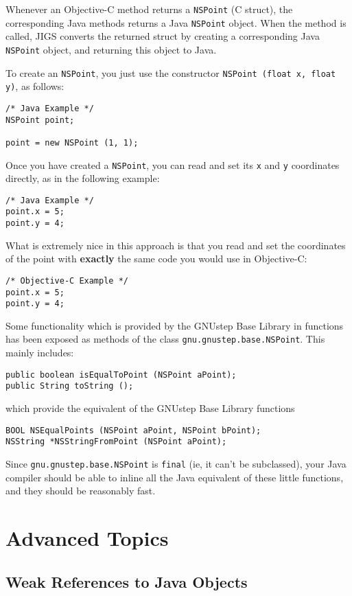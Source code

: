 Whenever an Objective-C method returns a \texttt{NSPoint} (C struct),
the corresponding Java methods returns a Java \texttt{NSPoint} object.
When the method is called, JIGS converts the returned struct by
creating a corresponding Java \texttt{NSPoint} object, and returning
this object to Java.

To create an \texttt{NSPoint}, you just use the constructor
\texttt{NSPoint (float x, float y)}, as follows:
\begin{verbatim}
/* Java Example */
NSPoint point;

point = new NSPoint (1, 1);
\end{verbatim}
Once you have created a \texttt{NSPoint}, you can read and set its
\texttt{x} and \texttt{y} coordinates directly, as in the following
example:
\begin{verbatim}
/* Java Example */
point.x = 5;
point.y = 4;
\end{verbatim}
What is extremely nice in this approach is that you read and set the
coordinates of the point with {\bf exactly} the same code you would
use in Objective-C:
\begin{verbatim}
/* Objective-C Example */
point.x = 5;
point.y = 4;
\end{verbatim}

Some functionality which is provided by the GNUstep Base Library in
functions has been exposed as methods of the class
\texttt{gnu.gnustep.base.NSPoint}.  This mainly includes:
\begin{verbatim}
public boolean isEqualToPoint (NSPoint aPoint);
public String toString ();
\end{verbatim}
which provide the equivalent of the GNUstep Base Library functions
\begin{verbatim}
BOOL NSEqualPoints (NSPoint aPoint, NSPoint bPoint);
NSString *NSStringFromPoint (NSPoint aPoint);
\end{verbatim}
Since \texttt{gnu.gnustep.base.NSPoint} is \texttt{final} (ie, it
can't be subclassed), your Java compiler should be able to inline all
the Java equivalent of these little functions, and they should be
reasonably fast.

\section{Advanced Topics}

\subsection{Weak References to Java Objects}


